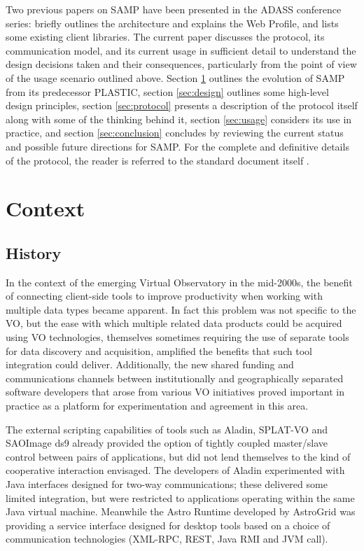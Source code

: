 \documentclass[5p]{elsarticle}
\begin{document}
Two previous papers on SAMP have been presented in the ADASS conference
series:
\citet{adassxxi_paper} briefly outlines the architecture and explains
the Web Profile, and \citet{adassxxii_bof} lists some existing
client libraries.
The current paper discusses the protocol,
its communication model, and its current usage
in sufficient detail to understand the design decisions taken
and their consequences,
particularly from the point of view of the usage scenario
outlined above.
Section \ref{sec:context} outlines the evolution of SAMP from
its predecessor PLASTIC,
section \ref{sec:design} outlines some high-level design principles,
section \ref{sec:protocol} presents a description of the protocol itself
along with some of the thinking behind it,
section \ref{sec:usage} considers its use in practice, and
section \ref{sec:conclusion} concludes by reviewing the current status
and possible future directions for SAMP.
For the complete and definitive details of the protocol,
the reader is referred to the standard document itself \citep{samp_std}.

\section{Context} \label{sec:context}

\subsection{History}

In the context of the emerging Virtual Observatory in the mid-2000s,
the benefit of connecting client-side tools to improve productivity
when working with multiple data types became apparent.
In fact this problem was not specific to the VO, 
but the ease with which multiple related data products
could be acquired using VO technologies,
themselves sometimes requiring the use of separate tools for
data discovery and acquisition,
amplified the benefits that such tool integration could deliver.
Additionally, the new shared funding and communications channels
between institutionally and geographically separated software developers
that arose from various VO initiatives
proved important in practice
as a platform for experimentation and agreement in this area.

The external scripting capabilities of tools such as Aladin, SPLAT-VO
and SAOImage ds9 already provided the option of tightly coupled master/slave
control between pairs of applications, but did not lend themselves
to the kind of cooperative interaction envisaged.
The developers of Aladin experimented with Java interfaces designed
for two-way communications; these delivered some limited integration,
but were restricted to applications operating within the same Java
virtual machine.
Meanwhile the Astro Runtime \citep{2007ASPC..376..571W} developed by
AstroGrid was providing a service interface designed for desktop
tools based on a choice of communication technologies
(XML-RPC, REST, Java RMI and JVM call).
\end{document}
